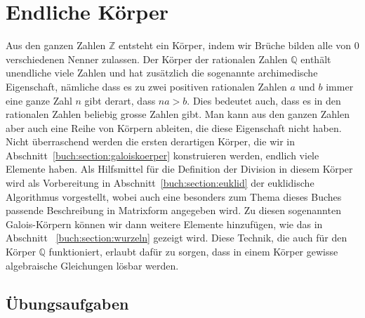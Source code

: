%
%
%
\chapter{Endliche Körper
\label{buch:chapter:endliche-koerper}}
\rhead{}
Aus den ganzen Zahlen $\mathbb{Z}$ entsteht ein Körper, indem wir Brüche
bilden alle von $0$ verschiedenen Nenner zulassen.
Der Körper der rationalen Zahlen $\mathbb{Q}$ enthält unendliche
viele Zahlen und hat zusätzlich die sogenannte archimedische Eigenschaft,
nämliche dass es zu zwei positiven rationalen Zahlen $a$ und $b$ immer eine
ganze Zahl $n$ gibt derart, dass $na>b$.
Dies bedeutet auch, dass es in den rationalen Zahlen beliebig grosse Zahlen
gibt.
Man kann aus den ganzen Zahlen aber auch eine Reihe von Körpern ableiten,
die diese Eigenschaft nicht haben.
Nicht überraschend werden die ersten derartigen Körper, die wir
in Abschnitt~\ref{buch:section:galoiskoerper} konstruieren werden,
endlich viele Elemente haben.
Als Hilfsmittel für die Definition der Division in diesem Körper wird
als Vorbereitung in Abschnitt~\ref{buch:section:euklid} der
euklidische Algorithmus vorgestellt, wobei auch eine besonders zum
Thema dieses Buches passende Beschreibung in Matrixform angegeben wird.
Zu diesen sogenannten Galois-Körpern können wir dann weitere Elemente
hinzufügen, wie das in Abschnitt ~\ref{buch:section:wurzeln} 
gezeigt wird.
Diese Technik, die auch für den Körper $\mathbb{Q}$ funktioniert, erlaubt
dafür zu sorgen, dass in einem Körper gewisse algebraische Gleichungen
lösbar werden.






\section*{Übungsaufgaben}
\begin{uebungsaufgaben}
\end{uebungsaufgaben}


